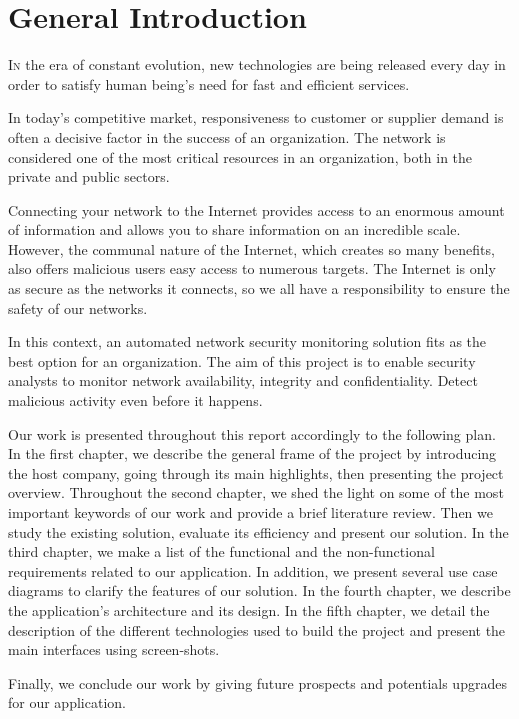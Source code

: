\chapter*{General Introduction}



\lettrine[lines=2]{I}n the era of constant evolution, new technologies are being released every day in order to satisfy human being's need for fast and efficient services.

In today's competitive market, responsiveness to customer or supplier demand is often a decisive factor in the success of an organization. The network is considered one of the most critical resources in an organization, both in the private and public sectors.

Connecting your network to the Internet provides access to an enormous amount of information and allows you to share information on an incredible scale. However, the communal nature of the Internet, which creates so many benefits, also offers malicious users easy access to numerous targets. The Internet is only as secure as the networks it connects, so we all have a responsibility to ensure the safety of our networks.

In this context, an automated network security monitoring solution fits as the best option for an organization. The aim of this project is to enable security analysts to monitor network availability, integrity and confidentiality. Detect malicious activity even before it happens.

Our work is presented throughout this report accordingly to the following plan. In the first chapter, we describe the general frame of the project by introducing the host company, going through its main highlights, then presenting the project overview. Throughout the second chapter, we shed the light on some of the most important keywords of our work and provide a brief literature review. Then we study the existing solution, evaluate its efficiency and present our solution. In the third chapter, we make a list of the functional and the non-functional requirements related to our application. In addition, we present several use case diagrams to clarify the features of our solution. In the fourth chapter, we describe the application's architecture and its design. In the fifth chapter, we detail the description of the different technologies used to build the project and present the main interfaces using screen-shots.

Finally, we conclude our work by giving future prospects and potentials upgrades for our application.
\thispagestyle{empty}